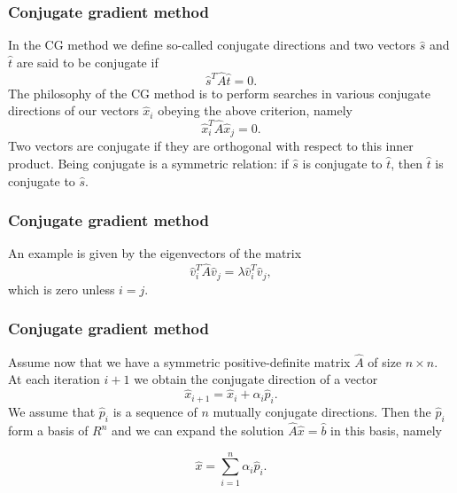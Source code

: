 \documentclass{beamer}
\begin{document}
\begin{frame}
\frametitle{Conjugate gradient method}

\begin{block}{}
In the CG method we define so-called conjugate directions and two vectors 
$\hat{s}$ and $\hat{t}$
are said to be
conjugate if
\begin{equation*}
\hat{s}^T\hat{A}\hat{t}= 0.
\end{equation*}
The philosophy of the CG method is to perform searches in various conjugate directions
of our vectors $\hat{x}_i$ obeying the above criterion, namely
\begin{equation*}
\hat{x}_i^T\hat{A}\hat{x}_j= 0.
\end{equation*}
Two vectors are conjugate if they are orthogonal with respect to 
this inner product. Being conjugate is a symmetric relation: if $\hat{s}$ is conjugate to $\hat{t}$, then $\hat{t}$ is conjugate to $\hat{s}$.
\end{block}
\end{frame}

\begin{frame}
\frametitle{Conjugate gradient method}

\begin{block}{}
An example is given by the eigenvectors of the matrix
\begin{equation*}
\hat{v}_i^T\hat{A}\hat{v}_j= \lambda\hat{v}_i^T\hat{v}_j,
\end{equation*}
which is zero unless $i=j$. 
\end{block}
\end{frame}

\begin{frame}
\frametitle{Conjugate gradient method}

\begin{block}{}
Assume now that we have a symmetric positive-definite matrix $\hat{A}$ of size
$n\times n$. At each iteration $i+1$ we obtain the conjugate direction of a vector
\begin{equation*}
\hat{x}_{i+1}=\hat{x}_{i}+\alpha_i\hat{p}_{i}. 
\end{equation*}
We assume that $\hat{p}_{i}$ is a sequence of $n$ mutually conjugate directions. 
Then the $\hat{p}_{i}$  form a basis of $R^n$ and we can expand the solution 
$  \hat{A}\hat{x} = \hat{b}$ in this basis, namely

\begin{equation*}
  \hat{x}  = \sum^{n}_{i=1} \alpha_i \hat{p}_i.
\end{equation*}
\end{block}
\end{frame}
\end{document}
